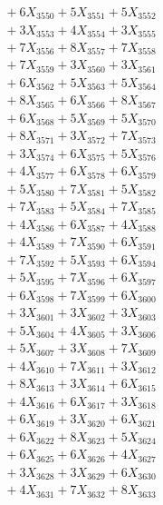 \documentclass[a4paper,10pt]{article}
\begin{document}
{\begin{align}
&\;  + 6 X_{3550} + 5 X_{3551} + 5 X_{3552} \\[0.3ex]
&\;  + 3 X_{3553} + 4 X_{3554} + 3 X_{3555} \\[0.3ex]
&\;  + 7 X_{3556} + 8 X_{3557} + 7 X_{3558} \\[0.3ex]
&\;  + 7 X_{3559} + 3 X_{3560} + 3 X_{3561} \\[0.3ex]
&\;  + 6 X_{3562} + 5 X_{3563} + 5 X_{3564} \\[0.3ex]
&\;  + 8 X_{3565} + 6 X_{3566} + 8 X_{3567} \\[0.3ex]
&\;  + 6 X_{3568} + 5 X_{3569} + 5 X_{3570} \\[0.3ex]
&\;  + 8 X_{3571} + 3 X_{3572} + 7 X_{3573} \\[0.3ex]
&\;  + 3 X_{3574} + 6 X_{3575} + 5 X_{3576} \\[0.3ex]
&\;  + 4 X_{3577} + 6 X_{3578} + 6 X_{3579} \\[0.5ex]\allowbreak
&\;  + 5 X_{3580} + 7 X_{3581} + 5 X_{3582} \\[0.3ex]
&\;  + 7 X_{3583} + 5 X_{3584} + 7 X_{3585} \\[0.3ex]
&\;  + 4 X_{3586} + 6 X_{3587} + 4 X_{3588} \\[0.3ex]
&\;  + 4 X_{3589} + 7 X_{3590} + 6 X_{3591} \\[0.3ex]
&\;  + 7 X_{3592} + 5 X_{3593} + 6 X_{3594} \\[0.3ex]
&\;  + 5 X_{3595} + 7 X_{3596} + 6 X_{3597} \\[0.3ex]
&\;  + 6 X_{3598} + 7 X_{3599} + 6 X_{3600} \\[0.3ex]
&\;  + 3 X_{3601} + 3 X_{3602} + 3 X_{3603} \\[0.3ex]
&\;  + 5 X_{3604} + 4 X_{3605} + 3 X_{3606} \\[0.3ex]
&\;  + 5 X_{3607} + 3 X_{3608} + 7 X_{3609} \\[0.5ex]\allowbreak
&\;  + 4 X_{3610} + 7 X_{3611} + 3 X_{3612} \\[0.3ex]
&\;  + 8 X_{3613} + 3 X_{3614} + 6 X_{3615} \\[0.3ex]
&\;  + 4 X_{3616} + 6 X_{3617} + 3 X_{3618} \\[0.3ex]
&\;  + 6 X_{3619} + 3 X_{3620} + 6 X_{3621} \\[0.3ex]
&\;  + 6 X_{3622} + 8 X_{3623} + 5 X_{3624} \\[0.3ex]
&\;  + 6 X_{3625} + 6 X_{3626} + 4 X_{3627} \\[0.3ex]
&\;  + 3 X_{3628} + 3 X_{3629} + 6 X_{3630} \\[0.3ex]
&\;  + 4 X_{3631} + 7 X_{3632} + 8 X_{3633} \\[0.3ex]

\end{align}}
\end{document}
